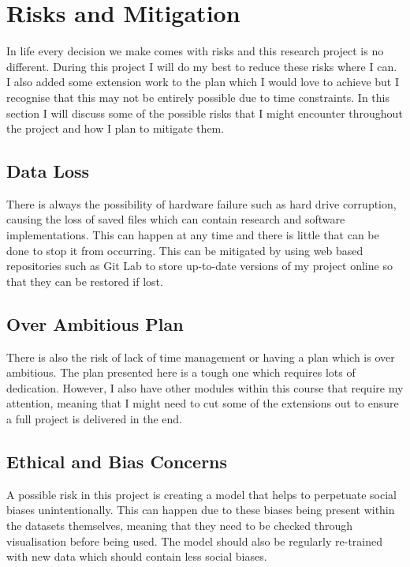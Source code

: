 \section{Risks and Mitigation}

In life every decision we make comes with risks and this research project is no different. During this project I will do my best to reduce these risks where I can. I also added some extension work to the plan which I would love to achieve but I recognise that this may not be entirely possible due to time constraints. In this section I will discuss some of the possible risks that I might encounter throughout the project and how I plan to mitigate them.

\subsection{Data Loss}

There is always the possibility of hardware failure such as hard drive corruption, causing the loss of saved files which can contain research and software implementations. This can happen at any time and there is little that can be done to stop it from occurring. This can be mitigated by using web based repositories such as Git Lab to store up-to-date versions of my project online so that they can be restored if lost. 

\subsection{Over Ambitious Plan}

There is also the risk of lack of time management or having a plan which is over ambitious. The plan presented here is a tough one which requires lots of dedication. However, I also have other modules within this course that require my attention, meaning that I might need to cut some of the extensions out to ensure a full project is delivered in the end.

\subsection{Ethical and Bias Concerns}

A possible risk in this project is creating a model that helps to perpetuate social biases unintentionally. This can happen due to these biases being present within the datasets themselves, meaning that they need to be checked through visualisation before being used. The model should also be regularly re-trained with new data which should contain less social biases.

